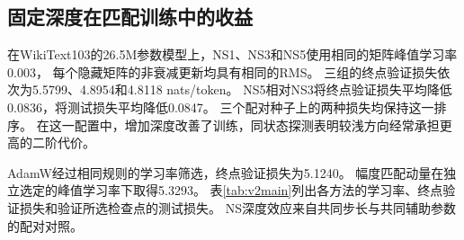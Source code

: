 \subsection{固定深度在匹配训练中的收益}
在WikiText103的26.5M参数模型上，NS1、NS3和NS5使用相同的矩阵峰值学习率0.003，
每个隐藏矩阵的非衰减更新均具有相同的RMS。
三组的终点验证损失依次为5.5799、4.8954和4.8118 nats/token。
NS5相对NS3将终点验证损失平均降低0.0836，将测试损失平均降低0.0847。
三个配对种子上的两种损失均保持这一排序。
在这一配置中，增加深度改善了训练，同状态探测表明较浅方向经常承担更高的二阶代价。

AdamW经过相同规则的学习率筛选，终点验证损失为5.1240。
幅度匹配动量在独立选定的峰值学习率下取得5.3293。
表\ref{tab:v2main}列出各方法的学习率、终点验证损失和验证所选检查点的测试损失。
NS深度效应来自共同步长与共同辅助参数的配对对照。

\begin{table}[htbp]\centering\small
\caption{WikiText103的26.5M参数模型。每种方法使用三个配对种子，表中为均值和一个样本标准差。损失单位为nats/token。}
\label{tab:v2main}

\end{table}


